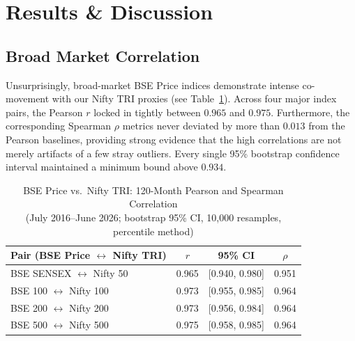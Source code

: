 \documentclass[conference]{IEEEtran}
\begin{document}
\section{Results \& Discussion}

\subsection{Broad Market Correlation}
Unsurprisingly, broad-market BSE Price indices demonstrate intense co-movement with our Nifty TRI proxies (see Table~\ref{tab:correlation}). Across four major index pairs, the Pearson $r$ locked in tightly between $0.965$ and $0.975$. Furthermore, the corresponding Spearman $\rho$ metrics never deviated by more than $0.013$ from the Pearson baselines, providing strong evidence that the high correlations are not merely artifacts of a few stray outliers. Every single 95\% bootstrap confidence interval maintained a minimum bound above $0.934$.

\begin{table}[htbp]
\caption{BSE Price vs.\ Nifty TRI: 120-Month Pearson and Spearman Correlation\\(July 2016--June 2026; bootstrap 95\% CI, 10{,}000 resamples, percentile method)}
\begin{center}
\footnotesize
\setlength{\tabcolsep}{4pt}
\begin{tabular}{lccc}
\toprule
\textbf{Pair (BSE Price $\leftrightarrow$ Nifty TRI)} & \textbf{$r$} & \textbf{95\% CI} & \textbf{$\rho$} \\
\midrule
BSE SENSEX $\leftrightarrow$ Nifty 50       & 0.965 & [0.940, 0.980] & 0.951 \\
BSE 100 $\leftrightarrow$ Nifty 100         & 0.973 & [0.955, 0.985] & 0.964 \\
BSE 200 $\leftrightarrow$ Nifty 200         & 0.973 & [0.956, 0.984] & 0.964 \\
BSE 500 $\leftrightarrow$ Nifty 500         & 0.975 & [0.958, 0.985] & 0.964 \\
\bottomrule
\end{tabular}
\label{tab:correlation}
\end{center}
\end{table}
\end{document}
